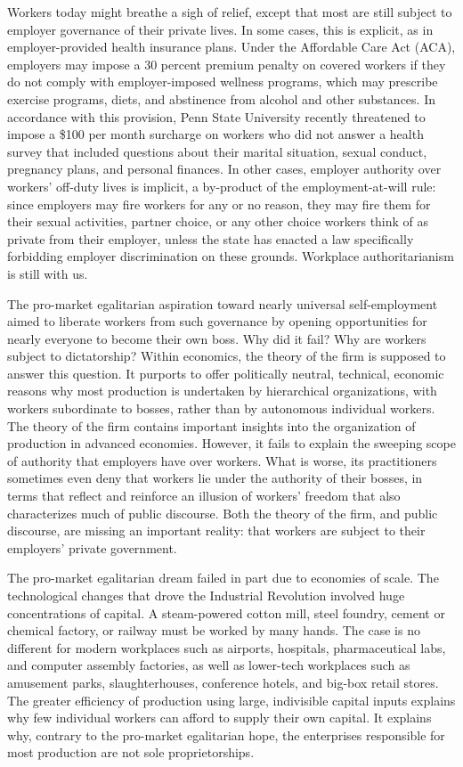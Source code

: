 \documentclass[
  letterpaper,
  11pt,
  DIV=9,
  openright]{scrbook}
\begin{document}
Workers today might breathe a sigh of relief, except that most are still
subject to employer governance of their private lives. In some cases,
this is explicit, as in employer-provided health insurance plans. Under
the Affordable Care Act (ACA), employers may impose a 30 percent premium
penalty on covered workers if they do not comply with employer-imposed
wellness programs, which may prescribe exercise programs, diets, and
abstinence from alcohol and other substances. In accordance with this
provision, Penn State University recently threatened to impose a \$100
per month surcharge on workers who did not answer a health survey that
included questions about their marital situation, sexual conduct,
pregnancy plans, and personal finances. In other cases, employer
authority over workers' off-duty lives is implicit, a by-product of the
employment-at-will rule: since employers may fire workers for any or no
reason, they may fire them for their sexual activities, partner choice,
or any other choice workers think of as private from their employer,
unless the state has enacted a law specifically forbidding employer
discrimination on these grounds. Workplace authoritarianism is still
with us.

The pro-market egalitarian aspiration toward nearly universal
self-employment aimed to liberate workers from such governance by
opening opportunities for nearly everyone to become their own boss. Why
did it fail? Why are workers subject to dictatorship? Within economics,
the theory of the firm is supposed to answer this question. It purports
to offer politically neutral, technical, economic reasons why most
production is undertaken by hierarchical organizations, with workers
subordinate to bosses, rather than by autonomous individual workers. The
theory of the firm contains important insights into the organization of
production in advanced economies. However, it fails to explain the
sweeping scope of authority that employers have over workers. What is
worse, its practitioners sometimes even deny that workers lie under the
authority of their bosses, in terms that reflect and reinforce an
illusion of workers' freedom that also characterizes much of public
discourse. Both the theory of the firm, and public discourse, are
missing an important reality: that workers are subject to their
employers' private government.

The pro-market egalitarian dream failed in part due to economies of
scale. The technological changes that drove the Industrial Revolution
involved huge concentrations of capital. A steam-powered cotton mill,
steel foundry, cement or chemical factory, or railway must be worked by
many hands. The case is no different for modern workplaces such as
airports, hospitals, pharmaceutical labs, and computer assembly
factories, as well as lower-tech workplaces such as amusement parks,
slaughterhouses, conference hotels, and big-box retail stores. The
greater efficiency of production using large, indivisible capital inputs
explains why few individual workers can afford to supply their own
capital. It explains why, contrary to the pro-market egalitarian hope,
the enterprises responsible for most production are not sole
proprietorships.
\end{document}

